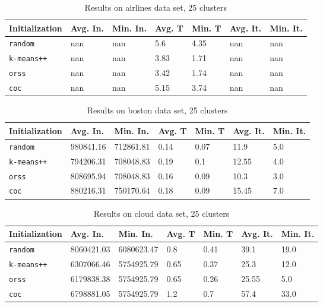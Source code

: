 \begin{table}[h]
	\begin{center}
		\begin{tabular}{|l|l|l|l|l|l|l|}
			\hline
			Initialization & Avg. In. & Min. In. & Avg. T & Min. T & Avg. It. & Min. It.\\\hline
			\texttt{random} & nan & nan & 5.6 & 4.35 & nan & nan\\\hline
			\texttt{k-means++} & nan & nan & 3.83 & 1.71 & nan & nan\\\hline
			\texttt{orss} & nan & nan & 3.42 & 1.74 & nan & nan\\\hline
			\texttt{coc} & nan & nan & 5.15 & 3.74 & nan & nan\\\hline
		\end{tabular}
		\caption{Results on airlines data set, 25 clusters}
		\label{tbl:airlines25}
	\end{center}
\end{table}

\begin{table}[h]
	\begin{center}
		\begin{tabular}{|l|l|l|l|l|l|l|}
			\hline
			Initialization & Avg. In. & Min. In. & Avg. T & Min. T & Avg. It. & Min. It.\\\hline
			\texttt{random} & 980841.16 & 712861.81 & 0.14 & 0.07 & 11.9 & 5.0\\\hline
			\texttt{k-means++} & 794206.31 & 708048.83 & 0.19 & 0.1 & 12.55 & 4.0\\\hline
			\texttt{orss} & 808695.94 & 708048.83 & 0.16 & 0.09 & 10.3 & 3.0\\\hline
			\texttt{coc} & 880216.31 & 750170.64 & 0.18 & 0.09 & 15.45 & 7.0\\\hline
		\end{tabular}
		\caption{Results on boston data set, 25 clusters}
		\label{tbl:boston25}
	\end{center}
\end{table}

\begin{table}[h]
	\begin{center}
		\begin{tabular}{|l|l|l|l|l|l|l|}
			\hline
			Initialization & Avg. In. & Min. In. & Avg. T & Min. T & Avg. It. & Min. It.\\\hline
			\texttt{random} & 8060421.03 & 6080623.47 & 0.8 & 0.41 & 39.1 & 19.0\\\hline
			\texttt{k-means++} & 6307066.46 & 5754925.79 & 0.65 & 0.37 & 25.3 & 12.0\\\hline
			\texttt{orss} & 6179838.38 & 5754925.79 & 0.65 & 0.26 & 25.55 & 5.0\\\hline
			\texttt{coc} & 6798881.05 & 5754925.79 & 1.2 & 0.7 & 57.4 & 33.0\\\hline
		\end{tabular}
		\caption{Results on cloud data set, 25 clusters}
		\label{tbl:cloud25}
	\end{center}
\end{table}

